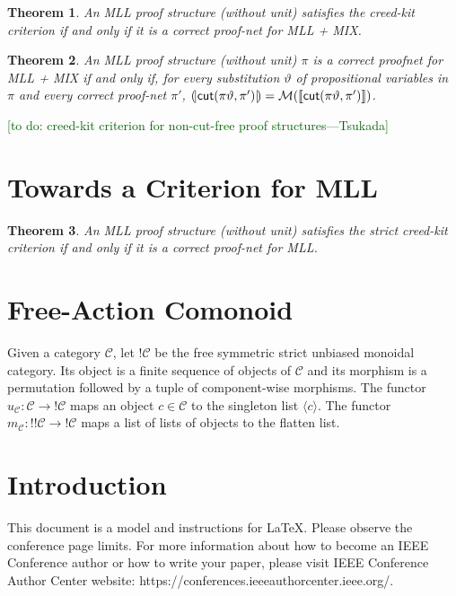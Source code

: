 \documentclass[conference]{IEEEtran}
\theoremstyle{plain}
\newtheorem{theorem}{Theorem}
\theoremstyle{definition}
\theoremstyle{remark}
\newcommand{\tk}[1]{{\textcolor{DarkGreen}{[{#1}---Tsukada]}}}
\newcommand{\tk}[1]{}
\begin{document}
\begin{theorem}
    An MLL proof structure (without unit) satisfies the creed-kit criterion if and only if it is a correct proof-net for MLL + MIX.
\end{theorem}


\begin{theorem}
    An MLL proof structure (without unit) \( \pi \) is a correct proofnet for MLL + MIX if and only if, for every substitution \( \vartheta \) of propositional variables in \( \pi \) and every correct proof-net \( \pi' \), \( (\!|{\mathsf{cut}(\pi\vartheta, \pi')}|\!) = \mathcal{M}({\llbracket{\mathsf{cut}(\pi\vartheta, \pi')}\rrbracket}) \). 
\end{theorem}

\tk{to do: creed-kit criterion for non-cut-free proof structures}


\section{Towards a Criterion for MLL}

\begin{theorem}
    An MLL proof structure (without unit) satisfies the strict creed-kit criterion if and only if it is a correct proof-net for MLL.
\end{theorem}



\section{Free-Action Comonoid}
Given a category \( \mathcal{C} \), let \( {!}\mathcal{C} \) be the free symmetric strict unbiased monoidal category.
Its object is a finite sequence of objects of \( \mathcal{C} \) and its morphism is a permutation followed by a tuple of component-wise morphisms.
The functor \( u_{\mathcal{C}} \colon \mathcal{C} \longrightarrow !\mathcal{C} \) maps an object \( c \in \mathcal{C} \) to the singleton list \( \langle c \rangle \).
The functor \( m_{\mathcal{C}} \colon {!}{!}\mathcal{C} \longrightarrow !\mathcal{C} \) maps a list of lists of objects to the flatten list.


\section{Introduction}
This document is a model and instructions for \LaTeX.
Please observe the conference page limits. For more information about how to become an IEEE Conference author or how to write your paper, please visit   IEEE Conference Author Center website: https://conferences.ieeeauthorcenter.ieee.org/.
\end{document}

